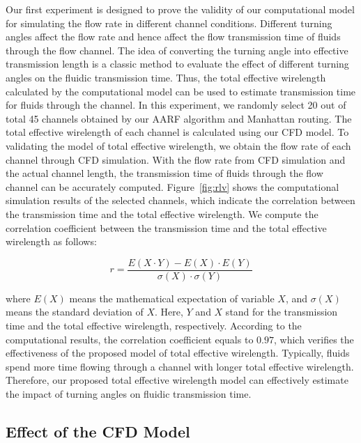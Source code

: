 \documentclass[journal]{IEEEtran}
\begin{document}
Our first experiment is designed to prove the validity of our computational model for simulating the flow rate in different channel conditions. 
Different turning angles affect the flow rate and hence affect the flow transmission time of fluids through the flow channel. 
The idea of converting the turning angle into effective transmission length is a classic method to evaluate the effect of different turning angles on the fluidic transmission time. 
Thus, the total effective wirelength calculated by the computational model can be used to estimate transmission time for fluids through the channel. 
In this experiment, we randomly select 20 out of total 45 channels obtained by our AARF algorithm and Manhattan routing. 
The total effective wirelength of each channel is calculated using our CFD model.
To validating the model of total effective wirelength, we obtain the flow rate of each channel through CFD simulation. 
With the flow rate from CFD simulation and the actual channel length, the transmission time of fluids through the flow channel can be accurately computed.
Figure~\ref{fig:rlv} shows the computational simulation results of the selected channels, which indicate the correlation between the transmission time and the total effective wirelength. We compute the correlation coefficient between the transmission time and the total effective wirelength as follows:

\begin{equation}
r = \frac{E(X \cdot Y) - E(X) \cdot E(Y)}{\sigma(X) \cdot \sigma(Y)}
\end{equation}

\noindent where $E(X)$ means the mathematical expectation of variable $X$, and $\sigma(X)$ means the standard deviation of $X$. Here, $Y$ and $X$ stand for the transmission time and the total effective wirelength, respectively. According to the computational results, the correlation coefficient equals to $0.97$, which verifies the effectiveness of the proposed model of total effective wirelength. 
Typically, fluids spend more time flowing through a channel with longer total effective wirelength. 
Therefore, our proposed total effective wirelength model can effectively estimate the impact of turning angles on fluidic transmission time.

\subsection{Effect of the CFD Model}
\end{document}
